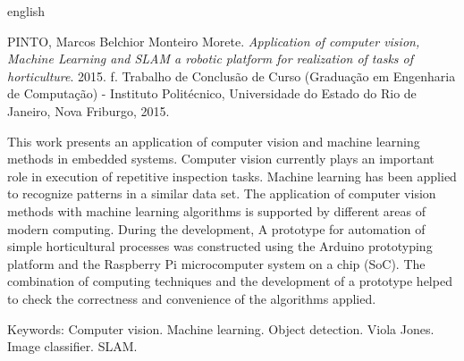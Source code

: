 
\begin{resumo}[Abstract]
\begin{otherlanguage*}{english}

\noindent
PINTO, Marcos Belchior Monteiro Morete. \textit{Application of computer vision, Machine Learning and SLAM a robotic platform for realization of tasks of horticulture}. 2015. \pageref{LastPage} f. Trabalho de Conclusão de Curso (Graduação em Engenharia de Computação) - Instituto Politécnico, Universidade do Estado do Rio de Janeiro, Nova Friburgo, 2015.
\vspace{\onelineskip}

\setlength{\parindent}{1.3cm}
This work presents an application of computer vision and machine learning methods in embedded systems. Computer vision currently plays an important role in execution of repetitive inspection tasks. Machine learning has been applied to recognize patterns in a similar data set. The application of computer vision methods with machine learning algorithms is supported by different areas of modern computing. During the development, A prototype for automation of simple horticultural processes was constructed using the Arduino prototyping platform and the Raspberry Pi microcomputer system on a chip (SoC). The combination of computing techniques and the development of a prototype helped to check the correctness and convenience of the algorithms applied.

\vspace{\onelineskip}
\noindent Keywords: Computer vision. Machine learning. Object detection. Viola Jones. Image classifier. SLAM.

\end{otherlanguage*}
\end{resumo}